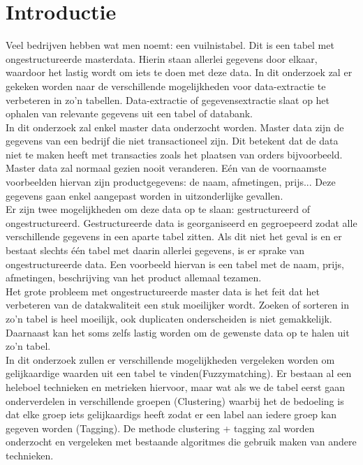 
\section{Introductie}%
\label{sec:introductie}
Veel bedrijven hebben wat men noemt: een vuilnistabel. Dit is een tabel met ongestructureerde masterdata. Hierin staan allerlei gegevens door elkaar, waardoor het lastig wordt om iets te doen met deze data. In dit onderzoek zal er gekeken worden naar de verschillende mogelijkheden voor data-extractie te verbeteren in zo'n tabellen. Data-extractie of gegevensextractie slaat op het ophalen van relevante gegevens uit een tabel of databank.
\\\indent
In dit onderzoek zal enkel master data onderzocht worden. Master data zijn de gegevens van een bedrijf die niet transactioneel zijn. Dit betekent dat de data niet te maken heeft met transacties zoals het plaatsen van orders bijvoorbeeld. Master data zal normaal gezien nooit veranderen. Eén van de voornaamste voorbeelden hiervan zijn productgegevens: de naam, afmetingen, prijs... Deze gegevens gaan enkel aangepast worden in uitzonderlijke gevallen.
\\\indent
Er zijn twee mogelijkheden om deze data op te slaan: gestructureerd of ongestructureerd. Gestructureerde data is georganiseerd en gegroepeerd zodat alle verschillende gegevens in een aparte tabel zitten. Als dit niet het geval is en er bestaat slechts één tabel met daarin allerlei gegevens, is er sprake van ongestructureerde data. Een voorbeeld hiervan is een tabel met de naam, prijs, afmetingen, beschrijving van het product allemaal tezamen.
\\\indent
Het grote probleem met ongestructureerde master data is het feit dat het verbeteren van de datakwaliteit een stuk moeilijker wordt. Zoeken of sorteren in zo'n tabel is heel moeilijk, ook duplicaten onderscheiden is niet gemakkelijk. Daarnaast kan het soms zelfs lastig worden om de gewenste data op te halen uit zo'n tabel.
\\\indent
In dit onderzoek zullen er verschillende mogelijkheden vergeleken worden om gelijkaardige waarden uit een tabel te vinden(Fuzzymatching). Er bestaan al een heleboel technieken en metrieken hiervoor, maar wat als we de tabel eerst gaan onderverdelen in verschillende groepen (Clustering) waarbij het de bedoeling is dat elke groep iets gelijkaardigs heeft zodat er een label aan iedere groep kan gegeven worden (Tagging). De methode clustering + tagging zal worden onderzocht en vergeleken met bestaande algoritmes die gebruik maken van andere technieken.
